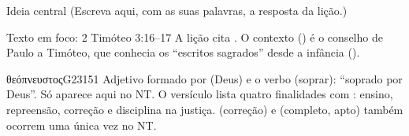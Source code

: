 \begin{campo}{Ideia central}
(Escreva aqui, com as suas palavras, a resposta da lição.)
\end{campo}

\begin{campo}{Texto em foco: 2 Timóteo 3:16–17}
A lição cita . O contexto () é o conselho de Paulo a
Timóteo, que conhecia os \enquote{escritos sagrados} desde a infância
().


\begin{lexico}{θεόπνευστος}{G2315}{1}
Adjetivo formado por  (Deus) e o verbo  (soprar):
\enquote{soprado por Deus}. Só aparece aqui no NT. O versículo lista quatro
finalidades com : ensino, repreensão, correção e disciplina na
justiça.  (correção) e  (completo, apto) também
ocorrem uma única vez no NT.
\end{lexico}
\end{campo}

